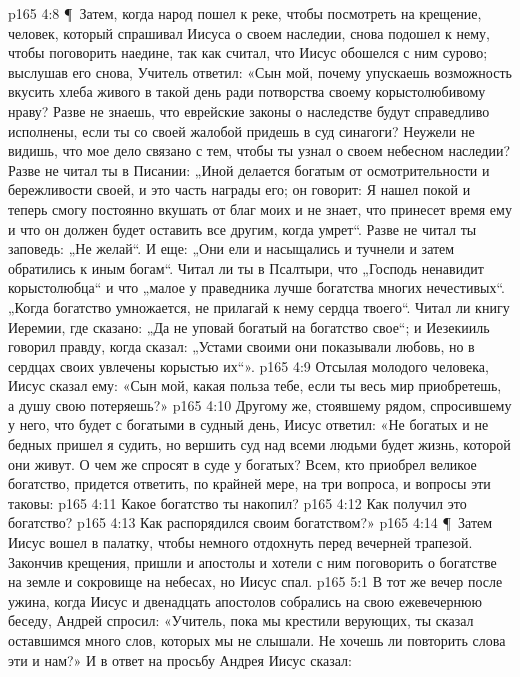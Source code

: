 \vs p165 4:8 \P\ Затем, когда народ пошел к реке, чтобы посмотреть на крещение, человек, который спрашивал Иисуса о своем наследии, снова подошел к нему, чтобы поговорить наедине, так как считал, что Иисус обошелся с ним сурово; выслушав его снова, Учитель ответил: «Сын мой, почему упускаешь возможность вкусить хлеба живого в такой день ради потворства своему корыстолюбивому нраву? Разве не знаешь, что еврейские законы о наследстве будут справедливо исполнены, если ты со своей жалобой придешь в суд синагоги? Неужели не видишь, что мое дело связано с тем, чтобы ты узнал о своем небесном наследии? Разве не читал ты в Писании: „Иной делается богатым от осмотрительности и бережливости своей, и это часть награды его; он говорит: Я нашел покой и теперь смогу постоянно вкушать от благ моих и не знает, что принесет время ему и что он должен будет оставить все другим, когда умрет“. Разве не читал ты заповедь: „Не желай“. И еще: „Они ели и насыщались и тучнели и затем обратились к иным богам“. Читал ли ты в Псалтыри, что „Господь ненавидит корыстолюбца“ и что „малое у праведника лучше богатства многих нечестивых“. „Когда богатство умножается, не прилагай к нему сердца твоего“. Читал ли книгу Иеремии, где сказано: „Да не уповай богатый на богатство свое“; и Иезекииль говорил правду, когда сказал: „Устами своими они показывали любовь, но в сердцах своих увлечены корыстью их“».
\vs p165 4:9 Отсылая молодого человека, Иисус сказал ему: «Сын мой, какая польза тебе, если ты весь мир приобретешь, а душу свою потеряешь?»
\vs p165 4:10 Другому же, стоявшему рядом, спросившему у него, что будет с богатыми в судный день, Иисус ответил: «Не богатых и не бедных пришел я судить, но вершить суд над всеми людьми будет жизнь, которой они живут. О чем же спросят в суде у богатых? Всем, кто приобрел великое богатство, придется ответить, по крайней мере, на три вопроса, и вопросы эти таковы:
\vs p165 4:11 \bibnobreakspace Какое богатство ты накопил?
\vs p165 4:12 \bibnobreakspace Как получил это богатство?
\vs p165 4:13 \bibnobreakspace Как распорядился своим богатством?»
\vs p165 4:14 \P\ Затем Иисус вошел в палатку, чтобы немного отдохнуть перед вечерней трапезой. Закончив крещения, пришли и апостолы и хотели с ним поговорить о богатстве на земле и сокровище на небесах, но Иисус спал.
\vs p165 5:1 В тот же вечер после ужина, когда Иисус и двенадцать апостолов собрались на свою ежевечернюю беседу, Андрей спросил: «Учитель, пока мы крестили верующих, ты сказал оставшимся много слов, которых мы не слышали. Не хочешь ли повторить слова эти и нам?» И в ответ на просьбу Андрея Иисус сказал:
